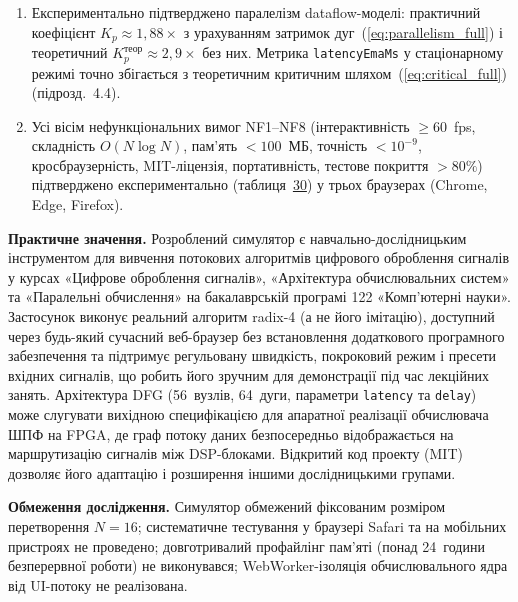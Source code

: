\documentclass[
]{article}
\begin{document}
\begin{enumerate}
  Верифіковано коректність симулятора на шести тестових
  сценаріях~(таблиця~\hyperref[tab:scenarios]{21}): функція
  \texttt{compareWithFFT}\texttt{()} не виявила жодного розбіжного
  спектрального відліку; максимальна абсолютна похибка не перевищила
  \(3 \times 10^{- 12}\), що на три порядки менше від порогу прийняття
  \(\varepsilon = 10^{- 9}\). Підтверджено ермітову симетрію
  \(X(N - k) = X^{*}(k)\) для дійсних вхідних послідовностей
  (підрозд.~4.3).
\item
  Експериментально підтверджено паралелізм dataflow-моделі: практичний
  коефіцієнт \(K_{p} \approx 1,88 \times\) з урахуванням затримок
  дуг~(\hyperref[eq:parallelism_full]{{[}eq:parallelism\_full{]}}) і
  теоретичний \(K_{p}^{\text{теор}} \approx 2,9 \times\) без них.
  Метрика \texttt{latencyEmaMs} у стаціонарному режимі точно збігається
  з теоретичним критичним
  шляхом~(\hyperref[eq:critical_full]{{[}eq:critical\_full{]}})
  (підрозд.~4.4).
\item
  Усі вісім нефункціональних вимог NF1--NF8 (інтерактивність
  \(\geq 60\)~fps, складність \(O(N\log N)\), пам'ять \(< 100\)~МБ,
  точність \(< 10^{- 9}\), кросбраузерність, MIT-ліцензія,
  портативність, тестове покриття \(> 80\%\)) підтверджено
  експериментально (таблиця~\hyperref[tab:nf_verify]{30}) у трьох
  браузерах (Chrome, Edge, Firefox).
\end{enumerate}

\textbf{Практичне значення.} Розроблений симулятор є
навчально-дослідницьким інструментом для вивчення потокових алгоритмів
цифрового оброблення сигналів у курсах «Цифрове оброблення сигналів»,
«Архітектура обчислювальних систем» та «Паралельні обчислення» на
бакалаврській програмі 122 «Комп'ютерні науки». Застосунок виконує
реальний алгоритм radix-4 (а не його імітацію), доступний через
будь-який сучасний веб-браузер без встановлення додаткового програмного
забезпечення та підтримує регульовану швидкість, покроковий режим і
пресети вхідних сигналів, що робить його зручним для демонстрації під
час лекційних занять. Архітектура DFG (56~вузлів, 64~дуги, параметри
\texttt{latency} та \texttt{delay}) може слугувати вихідною
специфікацією для апаратної реалізації обчислювача ШПФ на FPGA, де граф
потоку даних безпосередньо відображається на маршрутизацію сигналів між
DSP-блоками. Відкритий код проекту (MIT) дозволяє його адаптацію і
розширення іншими дослідницькими групами.

\textbf{Обмеження дослідження.} Симулятор обмежений фіксованим розміром
перетворення \(N = 16\); систематичне тестування у браузері Safari та на
мобільних пристроях не проведено; довготривалий профайлінг пам'яті
(понад 24~години безперервної роботи) не виконувався; WebWorker-ізоляція
обчислювального ядра від UI-потоку не реалізована.
\end{document}
